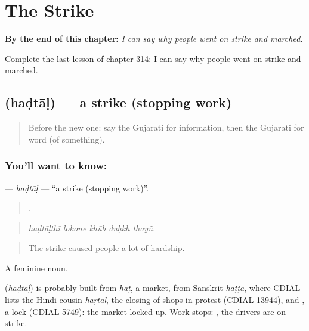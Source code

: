 
\chapter{The Strike}
\label{ch:gu-the-strike}

\begin{chapteropening}
\textbf{By the end of this chapter:} \emph{I can say why people went on strike and marched.}

Complete the last lesson of chapter 314: I can say why people went on strike and marched.
\end{chapteropening}

\section[\texorpdfstring{\gu{હડતાળ} (haḍtāḷ)}{હડતાળ (haḍtāḷ)}]{ (haḍtāḷ) — a strike (stopping work)}

\label{lesson:GU-C314-hadtal}



\begin{quote}
Before the new one: say the Gujarati for information, then the Gujarati for word (of something).
\end{quote}

\subsection*{You'll want to know: }
\textbf{} — \emph{haḍtāḷ} — \textquotedblleft{}a strike (stopping work)\textquotedblright{}.

\begin{quote}
    .
\end{quote}

\begin{quote}
\emph{haḍtāḷthī lokone khūb duḥkh thayũ.}
\end{quote}

\begin{quote}
The strike caused people a lot of hardship.
\end{quote}

A feminine noun.

\begin{cousinweb}
\textbf{} (\emph{haḍtāḷ}) is probably built from \emph{haṭ}, a market, from Sanskrit \emph{haṭṭa}, where CDIAL lists the Hindi cousin \emph{haṛtāl}, the closing of shops in protest (CDIAL 13944), and \textbf{}, a lock (CDIAL 5749): the market locked up. Work stops: \textbf{  }, the drivers are on strike.
\end{cousinweb}

